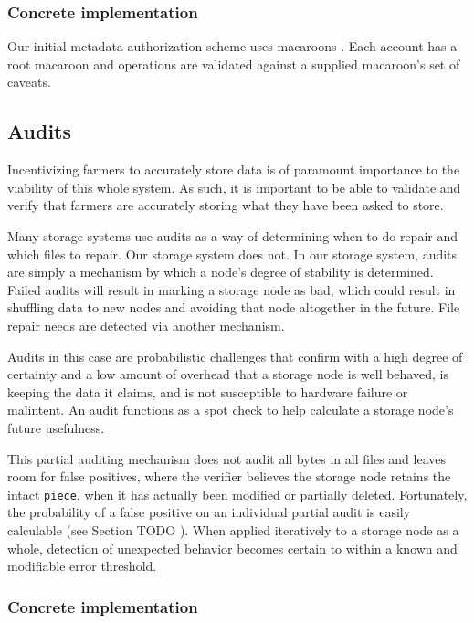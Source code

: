 \documentclass[a4paper,10pt]{article} \usepackage[utf8]{inputenc}
\newcommand{\x}[1]{{\tt #1}} \newcommand{\code}[1]{{\tt #1}}
\newcommand{\todo}[1]{{\color{red} TODO #1 }}
\begin{document}
\subsubsection{Concrete implementation}

Our initial metadata authorization scheme uses macaroons \cite{macaroons}.
Each account has a root macaroon and operations are validated against a supplied
macaroon's set of caveats.

\subsection{Audits}

Incentivizing farmers to accurately store data is of paramount importance to
the viability of this whole system. As such, it is important to be able to
validate and verify that farmers are accurately storing what they have been
asked to store.

Many storage systems use audits as a way of determining when to do repair and
which files to repair. Our storage system does not. In our storage system,
audits are simply a mechanism by which a node's degree of stability is
determined. Failed audits will result in marking a storage node as bad, which
could result in shuffling data to new nodes and avoiding that node altogether
in the future. File repair needs are detected via another mechanism.

Audits in this case are probabilistic challenges that confirm with a high
degree of certainty and a low amount of overhead that a storage node is well
behaved, is keeping the data it claims, and is not susceptible to hardware
failure or malintent. An audit functions as a spot check to help calculate a
storage node's future usefulness.

This partial auditing mechanism does not audit all bytes in all files and
leaves room for false positives, where the verifier believes the storage node
retains the intact \x{piece}, when it has actually been modified or partially
deleted. Fortunately, the probability of a false positive on an individual
partial audit is easily calculable (see Section \todo{}). When applied
iteratively to a storage node as a whole, detection of unexpected behavior
becomes certain to within a known and modifiable error threshold.

\subsubsection{Concrete implementation}
\end{document}
